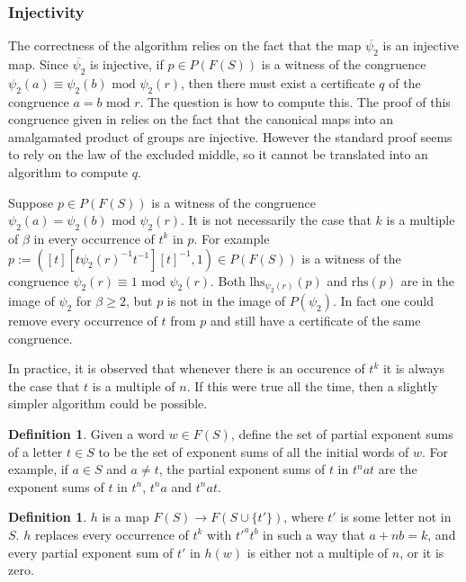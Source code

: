 \documentclass[12pt]{article} %
\theoremstyle{definition}
\theoremstyle{definition}
\theoremstyle{definition}
\theoremstyle{definition}
\theoremstyle{definition}
\newtheorem{defn}[theorem]{Definition}
\theoremstyle{definition}
\begin{document}
\subsubsection{Injectivity}\label{powproofs}

The correctness of the algorithm relies on the fact that the map $\overline{\psi_2}$ is an injective map.
Since $\overline{\psi_2}$ is injective, if $p \in P(F(S))$ is a witness of the congruence
$\psi_2(a) \equiv \psi_2(b) \text{ mod } \psi_2(r)$, then there must exist a certificate
$q$ of the congruence $a = b \text{ mod }r$. The question is how to compute this. The proof
of this congruence given in \cite{PutmanOneRelator} relies on the fact that the canonical maps into an amalgamated product
of groups are injective. However the standard proof
seems to rely on the law of the excluded middle, so
it cannot be translated into an algorithm to compute $q$.


Suppose $p \in P(F(S))$ is a witness of the congruence
$\psi_2(a) = \psi_2(b) \text{ mod } \psi_2(r)$. It is not necessarily the case that $k$
is a multiple of $\beta$ in every occurrence of $t^k$ in $p$. For example
$p := ([t][t\psi_2(r)^{-1}t^{-1}][t]^{-1}, 1) \in P(F(S))$ is a witness of the congruence
$\psi_2(r) \equiv 1\text{ mod } \psi_2(r)$. Both $\text{lhs}_{\psi_2(r)}(p)$
and $\text{rhs}(p)$ are in the image of
$\psi_2$ for $\beta \ge 2$,
but $p$ is not in the image of $P(\psi_2)$. In fact
one could remove every occurrence of $t$ from $p$ and still have a certificate of the same
congruence.

In practice, it is observed that whenever there is an occurence of $t^k$ it is always
the case that $t$ is a multiple of $n$. If this were true all the time, then a slightly
simpler algorithm could be possible.

\begin{defn}
  Given a word $w \in F(S)$, define the set of partial exponent sums of a letter $t \in S$ to
  be the set of exponent sums of all the initial words of $w$. For example, if $a \in S$ and
  $a \ne t$, the partial
  exponent sums of $t$ in $t^n a t$ are the exponent sums of $t$ in
  $t^n$, $t^na$ and $t^nat$.
\end{defn}

\begin{defn}
  $h$ is a map $F(S) \to F(S \cup \{t'\})$, where $t'$ is some letter not in $S$.
  $h$ replaces every occurrence of $t^k$ with $t'^at^b$ in such a way that $a + n b = k$,
  and every partial exponent sum of $t'$ in $h(w)$ is either not a multiple of $n$,
  or it is zero.
\end{defn}
\end{document}
